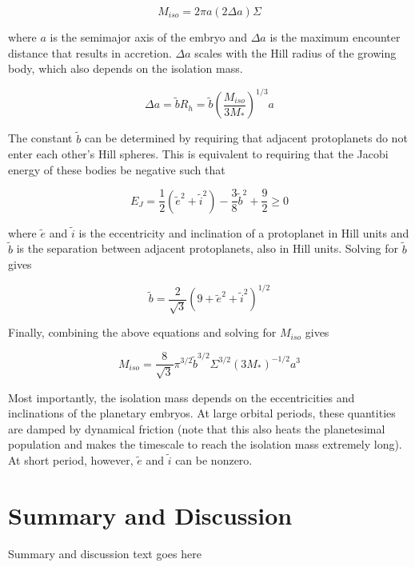 \documentclass[onecolumn]{aastex63}
\begin{document}
\begin{equation}
    M_{iso} = 2 \pi a \left( 2 \Delta a \right) \Sigma
\end{equation}

\noindent where $a$ is the semimajor axis of the embryo and $\Delta a$ is the maximum encounter distance that results in accretion. $\Delta a$ scales with the Hill radius of the growing body, which also depends on the isolation mass.

\begin{equation}
    \Delta a = \tilde{b} R_{h} = \tilde{b} \left( \frac{M_{iso}}{3 M_{*}} \right)^{1/3} a
\end{equation}

The constant $\tilde{b}$ can be determined by requiring that adjacent protoplanets do not enter each other's Hill spheres. This is equivalent to requiring that the Jacobi energy of these bodies be negative such that \citep{Hayashi1977}

\begin{equation}
    E_{J} = \frac{1}{2} \left( \tilde{e}^{2} + \tilde{i}^{2} \right) - \frac{3}{8} \tilde{b}^{2} + \frac{9}{2}  \geq 0
\end{equation}

\noindent where $\tilde{e}$ and  $\tilde{i}$ is the eccentricity and inclination of a protoplanet in Hill units and $\tilde{b}$ is the separation between adjacent protoplanets, also in Hill units. Solving for $\tilde{b}$ gives

\begin{equation}
    \tilde{b} = \frac{2}{\sqrt{3}} \left( 9 + \tilde{e}^{2} + \tilde{i}^{2} \right)^{1/2}
\end{equation}

Finally, combining the above equations and solving for $M_{iso}$ gives

\begin{equation}
    M_{iso} = \frac{8}{\sqrt{3}} \pi^{3/2} \tilde{b}^{3/2} \Sigma^{3/2} \left( 3 M_{*} \right)^{-1/2} a^{3}
\end{equation}

Most importantly, the isolation mass depends on the eccentricities and inclinations of the planetary embryos. At large orbital periods, these quantities are damped by dynamical friction (note that this also heats the planetesimal population and makes the timescale to reach the isolation mass extremely long). At short period, however, $\tilde{e}$ and  $\tilde{i}$ can be nonzero.

\section{Summary and Discussion} \label{sec:discuss}

Summary and discussion text goes here



\clearpage
\end{document}
